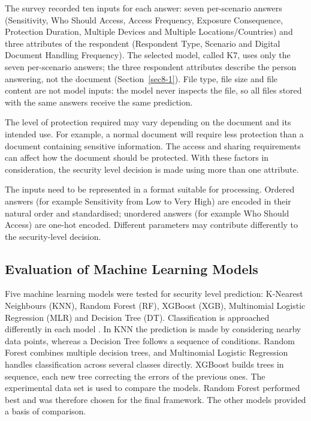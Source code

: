 \documentclass[pdflatex,sn-mathphys-num]{sn-jnl}
\begin{document}
The survey recorded ten inputs for each answer: seven per-scenario answers (Sensitivity, Who
Should Access, Access Frequency, Exposure Consequence, Protection Duration, Multiple Devices and
Multiple Locations/Countries) and three attributes of the respondent (Respondent Type, Scenario
and Digital Document Handling Frequency). The selected model, called K7, uses only the seven
per-scenario answers; the three respondent attributes describe the person answering, not the
document (Section~\ref{sec8-1}). File type, file size and file content are not model inputs: the
model never inspects the file, so all files stored with the same answers receive the same
prediction.

The level of protection required may vary depending on the document and its intended use. For
example, a normal document will require less protection than a document containing sensitive
information. The access and sharing requirements can affect how the document should be protected.
With these factors in consideration, the security level decision is made using more than one
attribute.

The inputs need to be represented in a format suitable for processing. Ordered answers (for
example Sensitivity from Low to Very High) are encoded in their natural order and standardised;
unordered answers (for example Who Should Access) are one-hot encoded. Different parameters may
contribute differently to the security-level decision.

\subsection{Evaluation of Machine Learning Models}

Five machine learning models were tested for security level prediction: K-Nearest Neighbours
(KNN), Random Forest (RF), XGBoost (XGB), Multinomial Logistic Regression (MLR) and Decision Tree
(DT). Classification is approached differently in each model \cite{theng2024feature}. In KNN the
prediction is made by considering nearby data points, whereas a Decision Tree follows a sequence of
conditions. Random Forest combines multiple decision trees, and Multinomial Logistic Regression
handles classification across several classes directly. XGBoost builds trees in sequence, each
new tree correcting the errors of the previous ones. The experimental data set is used to compare
the models. Random Forest performed best and was therefore chosen for the final framework. The
other models provided a basis of comparison.
\end{document}
